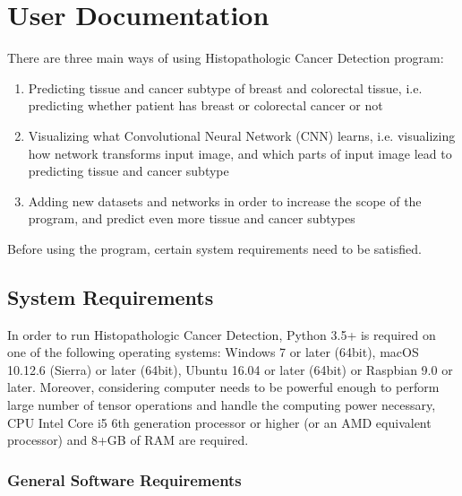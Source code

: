 \chapter{User Documentation}
\label{ch:user}

There are three main ways of using Histopathologic Cancer Detection program:
\begin{enumerate}
	\itemsep 0em
	\item Predicting tissue and cancer subtype of breast and colorectal tissue, i.e. predicting whether patient has breast or colorectal cancer or not
	\item Visualizing what Convolutional Neural Network (CNN) learns, i.e. visualizing how network transforms input image, and which parts of input image lead to predicting tissue and cancer subtype
	\item Adding new datasets and networks in order to increase the scope of the program, and predict even more tissue and cancer subtypes
\end{enumerate}
Before using the program, certain system requirements need to be satisfied.

\section{System Requirements}
\label{sysreq}

In order to run Histopathologic Cancer Detection, Python 3.5+ is required on one of the following operating systems: Windows 7 or later (64bit), macOS 10.12.6 (Sierra) or later (64bit), Ubuntu 16.04 or later (64bit) or Raspbian 9.0 or later. Moreover, considering computer needs to be powerful enough to perform large number of tensor operations and handle the computing power necessary, CPU Intel Core i5 6th generation processor or higher (or an AMD equivalent processor) and 8+GB of RAM are required.

\subsection{General Software Requirements}

